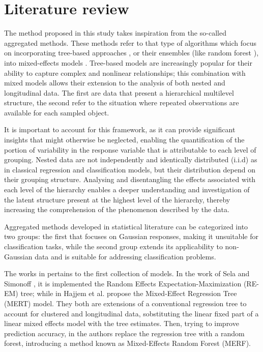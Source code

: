 \section{Literature review}
\label{sec:literature_rev}
The method proposed in this study takes inspiration from the so-called aggregated methods.
These methods refer to that type of algorithms which focus on incorporating tree-based approaches \cite{breiman2017classification}, or their ensembles (like random forest \cite{breiman2001random}), into mixed-effects models \cite{pinheiro2006mixed}.
Tree-based models are increasingly popular for their ability to capture complex and nonlinear relationships; this combination with mixed models allows their extension to the analysis of both nested and longitudinal data. The first are data that present a hierarchical multilevel structure, the second refer to the situation where repeated observations are available for each sampled object.

It is important to account for this framework, as it can provide significant insights that might otherwise be neglected, enabling the quantification of the portion of variability in the response variable that is attributable to each level of grouping. Nested data are not independently and identically distributed (i.i.d) as in classical regression and classification models, but their distribution depend on their grouping structure.
Analysing and disentangling the effects associated with each level of the hierarchy enables a deeper understanding and investigation of the latent structure present at the highest level of the hierarchy, thereby increasing the comprehension of the phenomenon described by the data.

Aggregated methods developed in statistical literature can be categorized into two groups: the first that focuses on Gaussian responses, making it unsuitable for classification tasks, while the second group extends its applicability to non-Gaussian data and is suitable for addressing classification problems.

The works in \cite{sela2012re,hajjem2011mixed,hajjem2014mixed} pertains to the first collection of models.
In the work of Sela and Simonoff \cite{sela2012re}, it is implemented the Random Effects Expectation-Maximization (RE-EM) tree; while in \cite{hajjem2011mixed} Hajjem et al. propose the Mixed-Effect Regression Tree (MERT) model.
They both are extensions of a conventional regression tree to account for clustered and longitudinal data, sobstituting the linear fixed part of a linear mixed effects model with the tree estimates. 
Then, trying to improve prediction accuracy, in \cite{hajjem2014mixed} the authors replace the regression tree with a random forest, introducing a method known as Mixed-Effects Random Forest (MERF).

